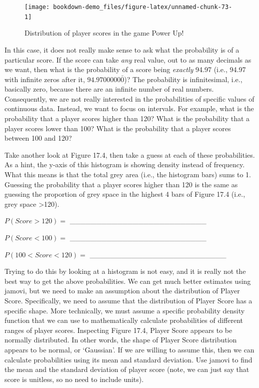 \documentclass[
]{scrbook}
\begin{document}
\begin{figure}
\texttt{[image: bookdown-demo\_files/figure-latex/unnamed-chunk-73-1]} \caption{Distribution of player scores in the game Power Up!}\label{fig:unnamed-chunk-73}
\end{figure}

In this case, it does not really make sense to ask what the probability is of a particular score.
If the score can take \emph{any} real value, out to as many decimals as we want, then what is the probability of a score being \emph{exactly} 94.97 (i.e., 94.97 with infinite zeros after it, \(94.9700000\bar{0}\))?
The probability is infinitesimal, i.e., basically zero, because there are an infinite number of real numbers.
Consequently, we are not really interested in the probabilities of specific values of continuous data.
Instead, we want to focus on intervals.
For example, what is the probability that a player scores higher than 120?
What is the probability that a player scores lower than 100?
What is the probability that a player scores between 100 and 120?

Take another look at Figure 17.4, then take a guess at each of these probabilities.
As a hint, the y-axis of this histogram is showing density instead of frequency.
What this means is that the total grey area (i.e., the histogram bars) sums to 1.
Guessing the probability that a player scores higher than 120 is the same as guessing the proportion of grey space in the highest 4 bars of Figure 17.4 (i.e., grey space \textgreater120).

\(P(Score>120) =\) \_\_\_\_\_\_\_\_\_\_\_\_\_\_\_\_\_\_\_\_\_\_\_\_\_\_

\(P(Score<100) =\) \_\_\_\_\_\_\_\_\_\_\_\_\_\_\_\_\_\_\_\_\_\_\_\_\_\_

\(P(100<Score<120) =\) \_\_\_\_\_\_\_\_\_\_\_\_\_\_\_\_\_\_\_\_\_\_\_\_\_\_

Trying to do this by looking at a histogram is not easy, and it is really not the best way to get the above probabilities.
We can get much better estimates using jamovi, but we need to make an assumption about the distribution of Player Score.
Specifically, we need to assume that the distribution of Player Score has a specific shape.
More technically, we must assume a specific probability density function that we can use to mathematically calculate probabilities of different ranges of player scores.
Inspecting Figure 17.4, Player Score appears to be normally distributed.
In other words, the shape of Player Score distribution appears to be normal, or `Gaussian'.
If we are willing to assume this, then we can calculate probabilities using its mean and standard deviation.
Use jamovi to find the mean and the standard deviation of player score (note, we can just say that score is unitless, so no need to include units).
\end{document}
